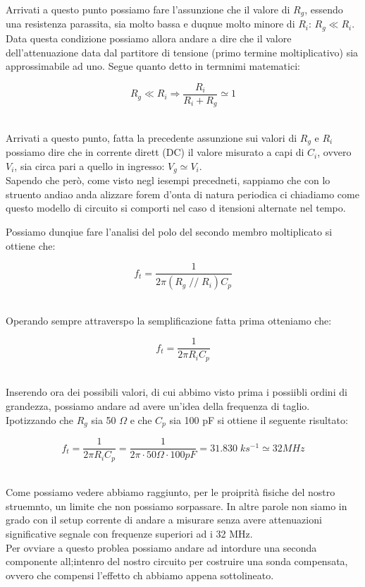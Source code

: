 \documentclass[../main.tex]{subfiles}
\begin{document}
Arrivati a questo punto possiamo fare l'assunzione che il valore di $R_g$, essendo una resistenza parassita, sia molto bassa e duqnue molto minore di $R_i$: $R_g \ll R_i$.
Data questa condizione possiamo allora andare a dire che il valore dell'attenuazione data dal partitore di tensione (primo termine moltiplicativo) sia approssimabile ad uno.
Segue quanto detto in termnimi matematici:

\[ R_g \ll R_i \Rightarrow \frac{R_i}{R_i + R_g}  \simeq 1 \]\

Arrivati a questo punto, fatta la precedente assunzione sui valori di $R_g$ e $R_i$ possiamo dire che in corrente dirett (DC) il valore misurato a capi di $C_i$, ovvero $V_i$, sia circa pari a quello in ingresso: $V_g \simeq V_i$.\\

Sapendo che però, come visto negl iesempi precedneti, sappiamo che con lo struento andiao anda alizzare forem d'onta di natura periodica ci chiadiamo come questo modello di circuito si comporti nel caso d itensioni alternate nel tempo.

Possiamo dunqiue fare l'analisi del polo del secondo membro moltiplicato si ottiene che:

\[ f_t = \frac{1}{2\pi (R_g \;//\; R_i)C_p}\]\

Operando sempre attraverspo la semplificazione fatta prima otteniamo che:

\[ f_t = \frac{1}{2\pi  R_i C_p}\]\

Inserendo ora dei possibili valori, di cui abbimo visto prima i possiibli ordini di grandezza, possiamo andare ad avere un'idea della frequenza di taglio.
Ipotizzando che $R_g$ sia 50 $\Omega$ e che $C_p$ sia 100 pF si ottiene il seguente risultato:

\[ f_t = \frac{1}{2\pi  R_i C_p} = \frac{1}{2\pi \cdot 50 \Omega \cdot 100 \unit{pF}} = 31.830\; \unit{ks^{-1}} \simeq 32 \unit{MHz} \]\


Come possiamo vedere abbiamo raggiunto, per le proiprità fisiche del nostro struemnto, un limite che non possiamo sorpassare. In altre parole non siamo in grado con il setup corrente di andare a misurare senza avere attenuazioni significative segnale con frequenze superiori ad i 32 MHz.\\

Per ovviare a questo problea possiamo andare ad intordure una seconda componente all;intenro del nostro circuito per costruire una sonda compensata, ovvero che compensi l'effetto ch abbiamo appena sottolineato.
\end{document}
